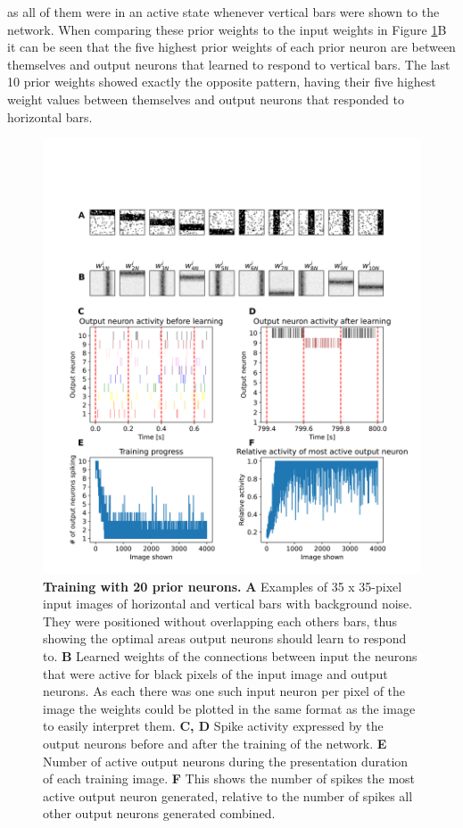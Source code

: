 as all of them were in an active state whenever vertical bars were shown to the network. When comparing these prior weights to the input weights in Figure \ref{fig:horvertAdaptiveInhibitionTraining}B it can be seen that the five highest prior weights of each prior neuron are between themselves and output neurons that learned to respond to vertical bars. The last 10 prior weights showed exactly the opposite pattern, having their five highest weight values between themselves and output neurons that responded to horizontal bars.

\begin{figure}
  \includegraphics[width=\linewidth]{figures/horvertAdaptiveInh/trainingPlot.png}
  \caption{\textbf{Training with 20 prior neurons.} \textbf{A} Examples of 35 x 35-pixel input images of horizontal and vertical bars with background noise. They were positioned without overlapping each others bars, thus showing the optimal areas output neurons should learn to respond to. \textbf{B} Learned weights of the connections between input the neurons that were active for black pixels of the input image and output neurons. As each there was one such input neuron per pixel of the image the weights could be plotted in the same format as the image to easily interpret them. \textbf{C, D} Spike activity expressed by the output neurons before and after the training of the network. \textbf{E} Number of active output neurons during the presentation duration of each training image. \textbf{F} This shows the number of spikes the most active output neuron generated, relative to the number of spikes all other output neurons generated combined. }
  \label{fig:horvertAdaptiveInhibitionTraining}
\end{figure}


